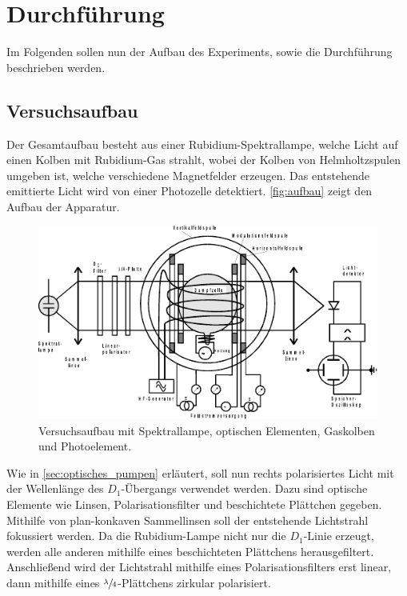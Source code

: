 \section{Durchführung}
\label{sec:durchfuehrung}

    Im Folgenden sollen nun der Aufbau des Experiments,
    sowie die Durchführung beschrieben werden.

\subsection{Versuchsaufbau}

    Der Gesamtaufbau besteht aus einer Rubidium-Spektrallampe,
    welche Licht auf einen Kolben mit Rubidium-Gas strahlt,
    wobei der Kolben von Helmholtzspulen umgeben ist,
    welche verschiedene Magnetfelder erzeugen.
    Das entstehende emittierte Licht wird von einer Photozelle detektiert.
    \autoref{fig:aufbau} zeigt den Aufbau der Apparatur.
    \begin{figure}
        \centering
        \includegraphics[width=\textwidth]{content/img/Abb_1.pdf}
        \caption{Versuchsaufbau mit Spektrallampe, optischen Elementen, Gaskolben und Photoelement. \cite{versuchsanleitung}}
        \label{fig:aufbau}
    \end{figure}

    Wie in \autoref{sec:optisches_pumpen} erläutert,
    soll nun rechts polarisiertes Licht mit der Wellenlänge des $D_1$-Übergangs verwendet werden.
    Dazu sind optische Elemente wie Linsen,
    Polarisationsfilter und beschichtete Plättchen gegeben.
    Mithilfe von plan-konkaven Sammellinsen soll der entstehende Lichtstrahl fokussiert werden.
    Da die Rubidium-Lampe nicht nur die $D_1$-Linie erzeugt,
    werden alle anderen mithilfe eines beschichteten Plättchens herausgefiltert.
    Anschließend wird der Lichtstrahl mithilfe eines Polarisationsfilters erst linear,
    dann mithilfe eines $\sfrac{\lambda}{4}$-Plättchens zirkular polarisiert.

